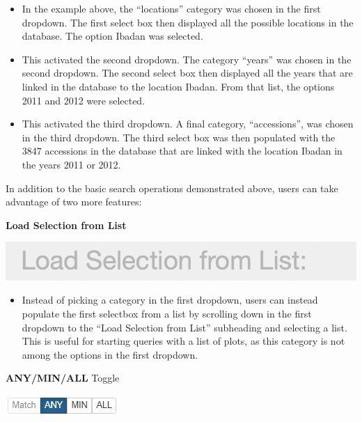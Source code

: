 \documentclass[
  12pt,
]{book}
\providecommand{\tightlist}{%
  \setlength{\itemsep}{0pt}\setlength{\parskip}{0pt}}
\begin{document}
\begin{itemize}
\item
  In the example above, the ``locations'' category was chosen in the first dropdown. The first select box then displayed all the possible locations in the database. The option Ibadan was selected.
\item
  This activated the second dropdown. The category ``years'' was chosen in the second dropdown. The second select box then displayed all the years that are linked in the database to the location Ibadan. From that list, the options 2011 and 2012 were selected.
\item
  This activated the third dropdown. A final category, ``accessions'', was chosen in the third dropdown. The third select box was then populated with the 3847 accessions in the database that are linked with the location Ibadan in the years 2011 or 2012.
\end{itemize}

In addition to the basic search operations demonstrated above, users can take advantage of two more features:

\textbf{Load Selection from List}

\begin{center}\includegraphics[width=0.25\linewidth]{assets/images/wizard_select_list} \end{center}

\begin{itemize}
\tightlist
\item
  Instead of picking a category in the first dropdown, users can instead populate the first selectbox from a list by scrolling down in the first dropdown to the ``Load Selection from List'' subheading and selecting a list. This is useful for starting queries with a list of plots, as this category is not among the options in the first dropdown.
\end{itemize}

\textbf{ANY/MIN/ALL} Toggle

\begin{center}\includegraphics[width=0.25\linewidth]{assets/images/wizard_any_min_all_toggle} \end{center}
\end{document}
